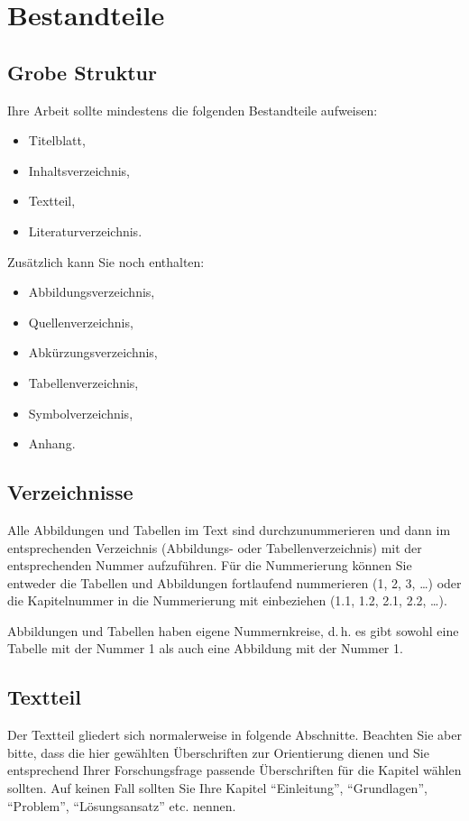\documentclass[a4paper,11pt,headings=normal]{scrartcl}
\begin{document}
\section{Bestandteile}

\subsection{Grobe Struktur}
Ihre Arbeit sollte mindestens die folgenden Bestandteile aufweisen:

\begin{itemize}
\item Titelblatt,
\item Inhaltsverzeichnis,
\item Textteil,
\item Literaturverzeichnis.
\end{itemize}

Zusätzlich kann Sie noch enthalten:

\begin{itemize}
\item Abbildungsverzeichnis,
\item Quellenverzeichnis,
\item Abkürzungsverzeichnis,
\item Tabellenverzeichnis,
\item Symbolverzeichnis,
\item Anhang.
\end{itemize}

\subsection{Verzeichnisse}
Alle Abbildungen und Tabellen im Text sind durchzunummerieren und dann im entsprechenden Verzeichnis (Abbildungs- oder Tabellenverzeichnis) mit der entsprechenden Nummer aufzuführen. Für die Nummerierung können Sie entweder die Tabellen und Abbildungen fortlaufend nummerieren (1, 2, 3, \dots) oder die Kapitelnummer in die Nummerierung mit einbeziehen (1.1, 1.2, 2.1, 2.2, \dots).

Abbildungen und Tabellen haben eigene Nummernkreise, d.\,h. es gibt sowohl eine Tabelle mit der Nummer 1 als auch eine Abbildung mit der Nummer 1.

\subsection{Textteil}
Der Textteil gliedert sich normalerweise in folgende Abschnitte. Beachten Sie aber bitte, dass die hier gewählten Überschriften zur Orientierung dienen und Sie entsprechend Ihrer Forschungsfrage passende Überschriften für die Kapitel wählen sollten. Auf keinen Fall sollten Sie Ihre Kapitel "`Einleitung"', "`Grundlagen"', "`Problem"', "`Lösungsansatz"' etc. nennen.
\end{document}
